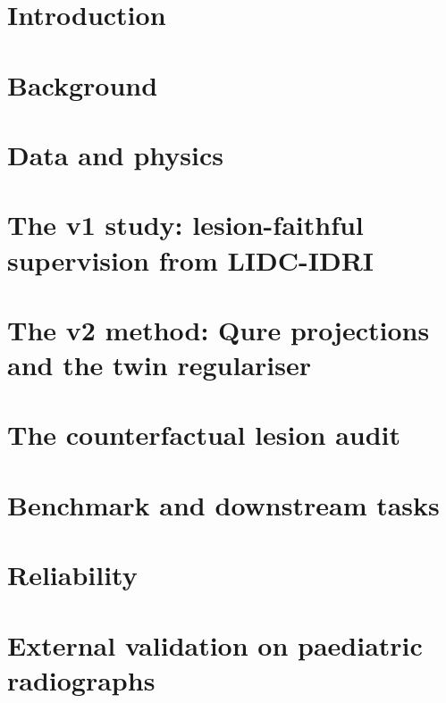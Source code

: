 \documentclass[11pt,a4paper,openany]{report}
\begin{document}
\cleardoublepage
{}

\chapter{Introduction}\label{ch:intro}


\chapter{Background}\label{ch:background}


\chapter{Data and physics}\label{ch:data}


\chapter{The v1 study: lesion-faithful supervision from LIDC-IDRI}\label{ch:v1}


\chapter{The v2 method: Qure projections and the twin regulariser}\label{ch:v2}


\chapter{The counterfactual lesion audit}\label{ch:audit}


\chapter{Benchmark and downstream tasks}\label{ch:benchmark}


\chapter{Reliability}\label{ch:reliability}


\chapter{External validation on paediatric radiographs}\label{ch:external}

\end{document}

